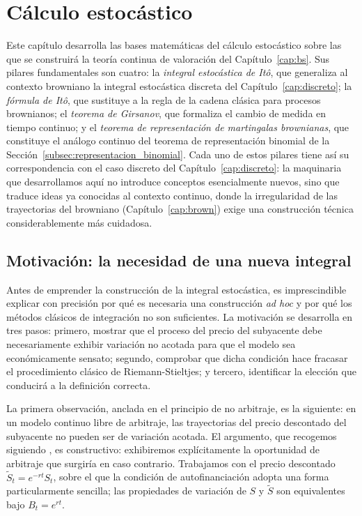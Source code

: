 \documentclass[11pt,a4paper,oneside]{report}
\theoremstyle{plain}
\theoremstyle{definition}
\theoremstyle{remark}
\newcommand{\1}{\mathbf{1}}
\begin{document}
\chapter{Cálculo estocástico}\label{cap:itocalculus}

Este capítulo desarrolla las bases matemáticas del cálculo estocástico sobre las que se construirá la teoría continua de
valoración del Capítulo~\ref{cap:bs}. Sus pilares fundamentales son cuatro:
la \emph{integral estocástica de Itô}, que generaliza al contexto
browniano la integral estocástica discreta del
Capítulo~\ref{cap:discreto}; la \emph{fórmula de Itô}, que sustituye a
la regla de la cadena clásica para procesos brownianos; el \emph{teorema
de Girsanov}, que formaliza el cambio de medida en tiempo continuo; y
el \emph{teorema de representación de martingalas brownianas}, que
constituye el análogo continuo del teorema de representación binomial
de la Sección~\ref{subsec:representacion_binomial}. Cada uno de estos pilares tiene así su correspondencia con el caso discreto del Capítulo~\ref{cap:discreto}: la maquinaria que desarrollamos aquí no
introduce conceptos esencialmente nuevos, sino que traduce ideas ya
conocidas al contexto continuo, donde la irregularidad de las trayectorias del
browniano (Capítulo~\ref{cap:brown}) exige una construcción técnica considerablemente más cuidadosa.

\section{Motivación: la necesidad de una nueva integral}
\label{sec:motivacion_ito}

Antes de emprender la construcción de la integral estocástica, es
imprescindible explicar con precisión por qué es necesaria una
construcción \emph{ad hoc} y por qué los métodos clásicos de
integración no son suficientes. La motivación se desarrolla en tres
pasos: primero, mostrar que el proceso del precio del subyacente debe
necesariamente exhibir variación no acotada para que el modelo sea
económicamente sensato; segundo, comprobar que dicha condición hace
fracasar el procedimiento clásico de Riemann-Stieltjes; y tercero,
identificar la elección que conducirá a la definición correcta.

La primera observación, anclada en el principio de no
arbitraje, es la siguiente: en un modelo continuo libre de arbitraje,
las trayectorias del precio descontado del subyacente no pueden ser
de variación acotada. El argumento, que recogemos siguiendo
\cite{etheridge}, es constructivo: exhibiremos explícitamente la
oportunidad de arbitraje que surgiría en caso contrario. Trabajamos
con el precio descontado $\widetilde S_t = e^{-rt} S_t$, sobre el que
la condición de autofinanciación adopta una forma particularmente
sencilla; las propiedades de variación de $S$ y $\widetilde S$ son
equivalentes bajo $B_t = e^{rt}$.
\end{document}
